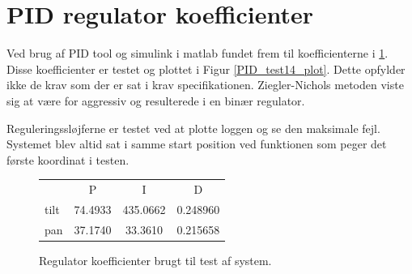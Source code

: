 \section{PID regulator koefficienter}
Ved brug af PID tool og simulink i matlab fundet frem til koefficienterne i \ref{PID_test14}.
Disse koefficienter er testet og plottet i Figur \ref{PID_test14_plot}.
Dette opfylder ikke de krav som der er sat i krav specifikationen.
Ziegler-Nichols metoden viste sig at være for aggressiv og resulterede i en binær regulator.

Reguleringssløjferne er testet ved at plotte loggen og se den maksimale fejl.
Systemet blev altid sat i samme start position ved funktionen som peger det første koordinat i testen.

\begin{figure}[h!]
\centering
  \begin{tabular}{lccc}
      & P & I & D\\[5pt]
tilt  & 74.4933 & 435.0662 & 0.248960\\
pan   & 37.1740 &  33.3610 & 0.215658
  \end{tabular}
\captionsetup{type=table}
\caption[Regulator koefficienter brugt i test]{Regulator koefficienter brugt til test af system.}
\label{PID_test14} 
\end{figure}


